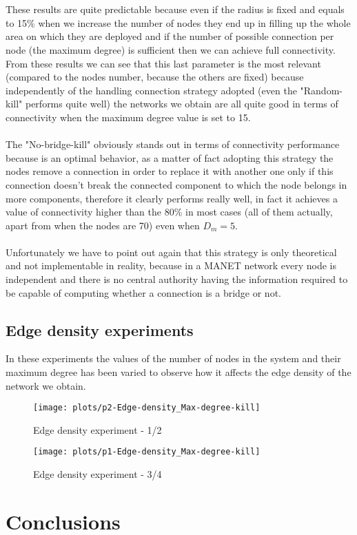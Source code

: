 \documentclass{llncs}
\begin{document}
\\\\
These results are quite predictable because even if the radius is fixed and equals to  15\% when we increase the number of nodes they end up in filling up the whole area on which they are deployed and if the number of possible connection per node (the maximum degree) is sufficient then we can achieve full connectivity.\\
From these results we can see that this last parameter is the most relevant (compared to the nodes number, because the others are fixed) because independently of the handling connection strategy adopted (even the "Random-kill" performs quite well) the networks we obtain are all quite good in terms of connectivity when the maximum degree value is set to 15.
\\\\
The "No-bridge-kill" obviously stands out in terms of connectivity performance because is an optimal behavior, as a matter of fact adopting this strategy the nodes remove a connection in order to replace it with another one only if this connection doesn't break the connected component to which the node belongs in more components, therefore it clearly performs really well, in fact it achieves a value of connectivity higher than the 80\% in most cases (all of them actually, apart from when the nodes are 70) even when $D_{m}=5$.\\\\
Unfortunately we have to point out again that this strategy is only theoretical and not implementable in reality, because in a MANET network every node is independent and there is no central authority having the information required to be capable of computing whether a connection is a bridge or not.
%
%
\subsection{Edge density experiments}
In these experiments the values of the number of nodes in the system and their maximum degree has been varied to observe how it affects the edge density of the network we obtain.
\begin{figure}[h!]
	\begin{minipage}{0.5\textwidth}
		\texttt{[image: plots/p2-Edge-density\_Max-degree-kill]}
		\caption{Edge density experiment - 1/2}
		\label{fig:edge1}
	\end{minipage}\hfill
	\begin{minipage}{0.5\textwidth}
		\centering
		\texttt{[image: plots/p1-Edge-density\_Max-degree-kill]}
		\caption{Edge density experiment - 3/4}
		\label{fig:edge2}
	\end{minipage}
\end{figure}
\section{Conclusions}
%
\begin{thebibliography}{}
	
\end{thebibliography}
\end{document}
